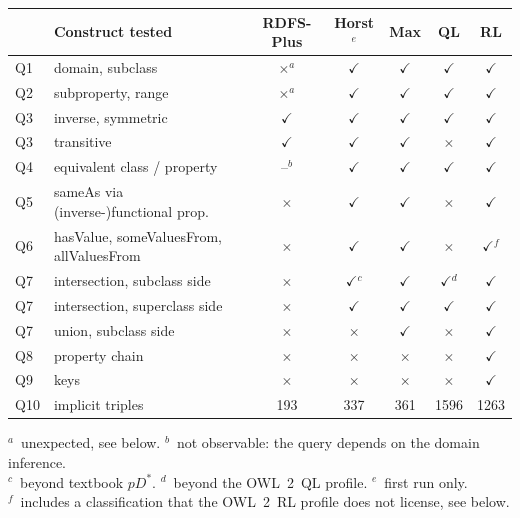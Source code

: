 \documentclass[11pt,a4paper]{article}
\begin{document}
\begin{table}[h]
\centering
\footnotesize
\newcommand{\tyes}{$\checkmark$}
\newcommand{\tno}{$\times$}
\begin{tabular}{@{}llccccc@{}}
\toprule
& \textbf{Construct tested} & \textbf{RDFS-Plus} & \textbf{Horst}$^{e}$ &
  \textbf{Max} & \textbf{QL} & \textbf{RL}\\
\midrule
Q1 & domain, subclass                        & \tno$^{a}$ & \tyes & \tyes & \tyes & \tyes\\
Q2 & subproperty, range                      & \tno$^{a}$ & \tyes & \tyes & \tyes & \tyes\\
Q3 & inverse, symmetric                      & \tyes & \tyes & \tyes & \tyes & \tyes\\
Q3 & transitive                              & \tyes & \tyes & \tyes & \tno & \tyes\\
Q4 & equivalent class / property            & --$^{b}$ & \tyes & \tyes & \tyes & \tyes\\
Q5 & sameAs via (inverse-)functional prop.   & \tno & \tyes & \tyes & \tno & \tyes\\
Q6 & hasValue, someValuesFrom, allValuesFrom & \tno & \tyes & \tyes & \tno & \tyes$^{f}$\\
Q7 & intersection, subclass side             & \tno & \tyes$^{c}$ & \tyes & \tyes$^{d}$ & \tyes\\
Q7 & intersection, superclass side           & \tno & \tyes & \tyes & \tyes & \tyes\\
Q7 & union, subclass side                    & \tno & \tno & \tyes & \tno & \tyes\\
Q8 & property chain                          & \tno & \tno & \tno & \tno & \tyes\\
Q9 & keys                                    & \tno & \tno & \tno & \tno & \tyes\\
\midrule
Q10 & implicit triples                      & 193 & 337 & 361 & 1596 & 1263\\
\bottomrule
\end{tabular}

\smallskip
\raggedright
$^{a}$~unexpected, see below.\quad
$^{b}$~not observable: the query depends on the domain inference.\\
$^{c}$~beyond textbook $pD^*$.\quad
$^{d}$~beyond the OWL~2~QL profile.\quad
$^{e}$~first run only.\\
$^{f}$~includes a classification that the OWL~2~RL profile does not license,
see below.
\end{table}
\end{document}
